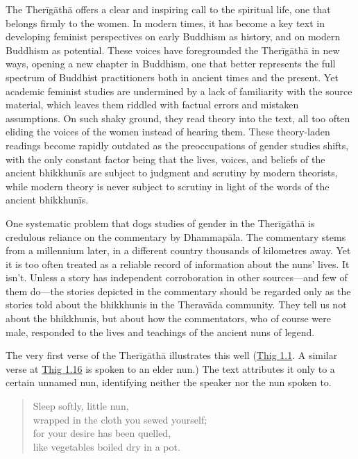 \documentclass[12pt,openany]{book}%
\begin{document}
The \textsanskrit{Therīgāthā} offers a clear and inspiring call to the spiritual life, one that belongs firmly to the women. In modern times, it has become a key text in developing feminist perspectives on early Buddhism as history, and on modern Buddhism as potential. These voices have foregrounded the \textsanskrit{Therīgāthā} in new ways, opening a new chapter in Buddhism, one that better represents the full spectrum of Buddhist practitioners both in ancient times and the present. Yet academic feminist studies are undermined by a lack of familiarity with the source material, which leaves them riddled with factual errors and mistaken assumptions. On such shaky ground, they read theory into the text, all too often eliding the voices of the women instead of hearing them. These theory-laden readings become rapidly outdated as the preoccupations of gender studies shifts, with the only constant factor being that the lives, voices, and beliefs of the ancient \textsanskrit{bhikkhunīs} are subject to judgment and scrutiny by modern theorists, while modern theory is never subject to scrutiny in light of the words of the ancient \textsanskrit{bhikkhunīs}.

One systematic problem that dogs studies of gender in the \textsanskrit{Therīgāthā} is credulous reliance on the commentary by \textsanskrit{Dhammapāla}. The commentary stems from a millennium later, in a different country thousands of kilometres away. Yet it is too often treated as a reliable record of information about the nuns’ lives. It isn’t. Unless a story has independent corroboration in other sources—and few of them do—the stories depicted in the commentary should be regarded only as the stories told about the bhikkhunis in the \textsanskrit{Theravāda} community. They tell us not about the bhikkhunis, but about how the commentators, who of course were male, responded to the lives and teachings of the ancient nuns of legend.

The very first verse of the \textsanskrit{Therīgāthā} illustrates this well (\href{https://suttacentral.net/thig1.1}{Thig 1.1}. A similar verse at \href{https://suttacentral.net/thig1.16}{Thig 1.16} is spoken to an elder nun.) The text attributes it only to a certain unnamed nun, identifying neither the speaker nor the nun spoken to.

\begin{verse}%
Sleep softly, little nun, \\
wrapped in the cloth you sewed yourself; \\
for your desire has been quelled, \\
like vegetables boiled dry in a pot.

%
\end{verse}
\end{document}
